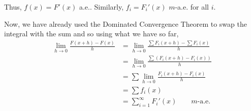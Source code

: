 \documentclass[12pt]{Homework}
\begin{document}
\begin{solution}
Thus, $f(x)=F'(x)$ a.e.. Similarly, $f_i=F_i'(x)$ $m$-a.e. for all $i.$

Now, we have already used the Dominated Convergence Theorem to swap the integral with the sum and so using what we have so far, \begin{align*}
    \lim_{h\to0}\frac{F(x+h)-F(x)}{h}&=\lim_{h\to0}\frac{\sum F_i(x+h)-\sum F_i(x)}{h}\\
    &=\lim_{h\to0}\frac{\sum(F_i(x+h)-F_i(x))}{h}\\
    &=\sum\lim_{h\to0}\frac{F_i(x+h)-F_i(x)}{h}\\
    &=\sum f_i(x)\\
    &=\sum_{i=1}^\infty F_i'(x)\qquad m\text{-a.e.}
\end{align*}
\end{solution}
\vspace{0.5cm}
\end{document}
